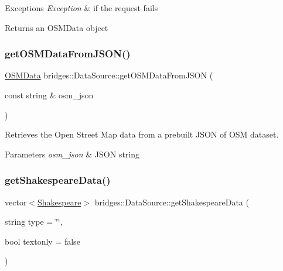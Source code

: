 \begin{DoxyExceptions}{Exceptions}
{\em Exception} & if the request fails\\
\hline
\end{DoxyExceptions}
\begin{DoxyReturn}{Returns}
an O\+S\+M\+Data object 
\end{DoxyReturn}
\mbox{\label{classbridges_1_1_data_source_a1b483de1cce9921b70116213382cdaf0}} 
\subsubsection{\texorpdfstring{get\+O\+S\+M\+Data\+From\+J\+S\+O\+N()}{getOSMDataFromJSON()}}
{\footnotesize\ttfamily \hyperlink{classbridges_1_1dataset_1_1_o_s_m_data}{O\+S\+M\+Data} bridges\+::\+Data\+Source\+::get\+O\+S\+M\+Data\+From\+J\+S\+ON (\begin{DoxyParamCaption}\item[{const string \&}]{osm\+\_\+json }\end{DoxyParamCaption})\hspace{0.3cm}{\ttfamily [inline]}}



Retrieves the Open Street Map data from a prebuilt J\+S\+ON of O\+SM dataset. 


\begin{DoxyParams}{Parameters}
{\em osm\+\_\+json} & J\+S\+ON string \\
\hline
\end{DoxyParams}
\mbox{\label{classbridges_1_1_data_source_a8b73299a4c1c71d2e32431a8d4a7be81}} 
\subsubsection{\texorpdfstring{get\+Shakespeare\+Data()}{getShakespeareData()}}
{\footnotesize\ttfamily vector$<$\hyperlink{classbridges_1_1dataset_1_1_shakespeare}{Shakespeare}$>$ bridges\+::\+Data\+Source\+::get\+Shakespeare\+Data (\begin{DoxyParamCaption}\item[{string}]{type = {\ttfamily \char`\"{}\char`\"{}},  }\item[{bool}]{textonly = {\ttfamily false} }\end{DoxyParamCaption})\hspace{0.3cm}{\ttfamily [inline]}}



